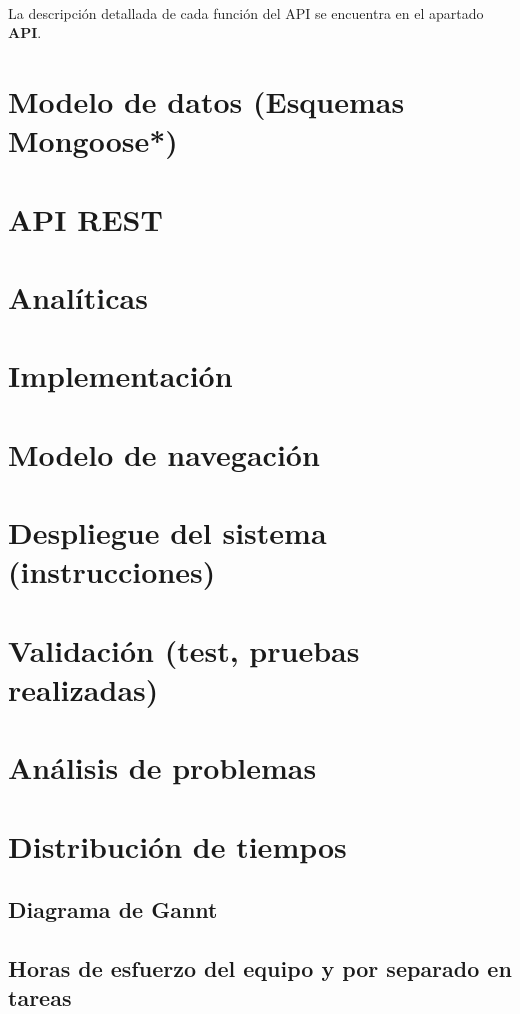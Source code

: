 \documentclass[a4paper]{article}
\begin{document}
		\paragraph{} La descripción detallada de cada función del API se encuentra en el apartado \textbf{API}.

\section{Modelo de datos (Esquemas Mongoose*)}

\section{API REST}

\section{Analíticas}

\section{Implementación}

\section{Modelo de navegación}

\section{Despliegue del sistema (instrucciones)}

\section{Validación (test, pruebas realizadas)}

\section{Análisis de problemas}

\section{Distribución de tiempos}
	\subsection{Diagrama de Gannt}
	\subsection{Horas de esfuerzo del equipo y por separado en tareas}
\end{document}
